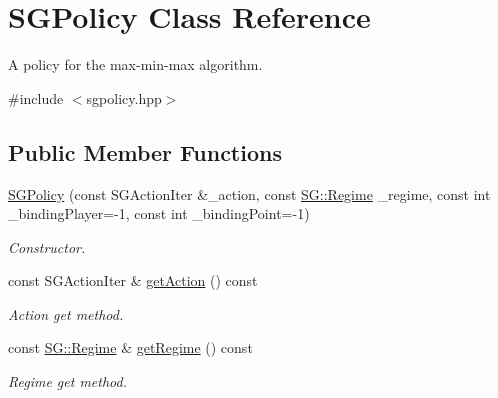 \hypertarget{classSGPolicy}{}\section{S\+G\+Policy Class Reference}
\label{classSGPolicy}


A policy for the max-\/min-\/max algorithm.  




{\ttfamily \#include $<$sgpolicy.\+hpp$>$}

\subsection*{Public Member Functions}
\begin{DoxyCompactItemize}
\item 
\mbox{\label{classSGPolicy_a69315c332cd0ba528afffeebedcfdde2}} 
\hyperlink{classSGPolicy_a69315c332cd0ba528afffeebedcfdde2}{S\+G\+Policy} (const S\+G\+Action\+Iter \&\+\_\+action, const \hyperlink{namespaceSG_a139e4dec41ea0f38aae1f93f60cfff60}{S\+G\+::\+Regime} \+\_\+regime, const int \+\_\+binding\+Player=-\/1, const int \+\_\+binding\+Point=-\/1)
\begin{DoxyCompactList}\small\item\em Constructor. \end{DoxyCompactList}\item 
\mbox{\label{classSGPolicy_a82215868ccbb92fb37d49906ad0c1b97}} 
const S\+G\+Action\+Iter \& \hyperlink{classSGPolicy_a82215868ccbb92fb37d49906ad0c1b97}{get\+Action} () const
\begin{DoxyCompactList}\small\item\em Action get method. \end{DoxyCompactList}\item 
\mbox{\label{classSGPolicy_a9938fc65d15bff073c227d9bb3c76da2}} 
const \hyperlink{namespaceSG_a139e4dec41ea0f38aae1f93f60cfff60}{S\+G\+::\+Regime} \& \hyperlink{classSGPolicy_a9938fc65d15bff073c227d9bb3c76da2}{get\+Regime} () const
\begin{DoxyCompactList}\small\item\em Regime get method. \end{DoxyCompactList}\item 
\mbox{\label{classSGPolicy_aa0c3081c030f86b58d843e0b5ba21ba9}} 

\end{DoxyCompactItemize}

